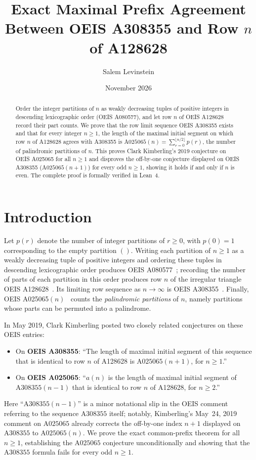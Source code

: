 \documentclass[11pt]{article}
\title{Exact Maximal Prefix Agreement Between OEIS A308355 and Row $n$ of A128628}
\author{Salem Levinstein}
\date{November 2026}
\begin{document}
\maketitle

\begin{abstract}
Order the integer partitions of $n$ as weakly decreasing tuples of positive integers in descending lexicographic order (OEIS A080577), and let row $n$ of OEIS A128628 record their part counts. We prove that the row limit sequence OEIS A308355 exists and that for every integer $n \ge 1$, the length of the maximal initial segment on which row $n$ of A128628 agrees with A308355 is $\mathrm{A025065}(n) = \sum_{r=0}^{\lfloor n/2 \rfloor} p(r)$, the number of palindromic partitions of $n$. This proves Clark Kimberling's 2019 conjecture on OEIS A025065 for all $n \ge 1$ and disproves the off-by-one conjecture displayed on OEIS A308355 ($\mathrm{A025065}(n+1)$) for every odd $n \ge 1$, showing it holds if and only if $n$ is even. The complete proof is formally verified in Lean~4.
\end{abstract}

\section{Introduction}

Let $p(r)$ denote the number of integer partitions of $r \ge 0$, with $p(0) = 1$ corresponding to the empty partition $()$. Writing each partition of $n \ge 1$ as a weakly decreasing tuple of positive integers and ordering these tuples in descending lexicographic order produces OEIS A080577~\cite{A080577}; recording the number of parts of each partition in this order produces row $n$ of the irregular triangle OEIS A128628~\cite{A128628}. Its limiting row sequence as $n \to \infty$ is OEIS A308355~\cite{A308355}. Finally, OEIS A025065$(n)$~\cite{A025065} counts the \emph{palindromic partitions} of $n$, namely partitions whose parts can be permuted into a palindrome.

In May 2019, Clark Kimberling posted two closely related conjectures on these OEIS entries:
\begin{itemize}
\item On \textbf{OEIS A308355}: ``The length of maximal initial segment of this sequence that is identical to row $n$ of A128628 is $\mathrm{A025065}(n+1)$, for $n \ge 1$.''
\item On \textbf{OEIS A025065}: ``$a(n)$ is the length of maximal initial segment of $\mathrm{A308355}(n-1)$ that is identical to row $n$ of A128628, for $n \ge 2$.''
\end{itemize}
Here ``$\mathrm{A308355}(n-1)$'' is a minor notational slip in the OEIS comment referring to the sequence $\mathrm{A308355}$ itself; notably, Kimberling's May~24, 2019 comment on $\mathrm{A025065}$ already corrects the off-by-one index $n+1$ displayed on $\mathrm{A308355}$ to $\mathrm{A025065}(n)$. We prove the exact common-prefix theorem for all $n \ge 1$, establishing the $\mathrm{A025065}$ conjecture unconditionally and showing that the $\mathrm{A308355}$ formula fails for every odd $n \ge 1$.
\end{document}
